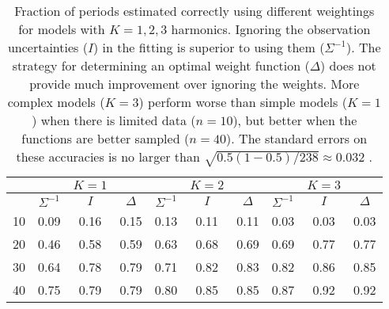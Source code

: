 \begin{table}[ht]
\centering
\begin{tabular}{c|ccc|ccc|ccc}
 &  & $K=1$ & &   & $K=2$ &  &  & $K=3$ &  \\ 
  \hline
 & $\Sigma^{-1}$ &  $I$ & $\Delta$ & $\Sigma^{-1}$ &  $I$ & $\Delta$ & $\Sigma^{-1}$ &  $I$ & $\Delta$\\
  \hline10&0.09&0.16&0.15&0.13&0.11&0.11&0.03&0.03&0.03\\20&0.46&0.58&0.59&0.63&0.68&0.69&0.69&0.77&0.77\\30&0.64&0.78&0.79&0.71&0.82&0.83&0.82&0.86&0.85\\40&0.75&0.79&0.79&0.80&0.85&0.85&0.87&0.92&0.92\\\hline
\end{tabular}
\caption{Fraction of periods estimated correctly using different weightings for models with $K=1,2,3$ harmonics. Ignoring the observation uncertainties ($I$) in the fitting is superior to using them ($\Sigma^{-1}$). The strategy for determining an optimal weight function ($\Delta$) does not provide much improvement over ignoring the weights. More complex models ($K=3$) perform worse than simple models ($K=1$) when there is limited data ($n=10$), but better when the functions are better sampled ($n=40$). The standard errors on these accuracies is no larger than $\sqrt{0.5(1-0.5)/238} \approx 0.032$ .}
\label{tab:period_est_results}
\end{table}
